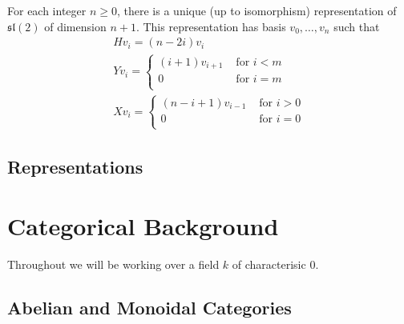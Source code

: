 \documentclass[]{article}
\newcommand{\sll}{\mathfrak{sl}}
\numberwithin{equation}{subsection}
\begin{document}
For each integer $n \geq 0$, there is a unique (up to isomorphism) representation of $\sll(2)$ of dimension $n+1$. This representation has basis $v_0, \ldots, v_{n}$ such that
\begin{align*}
    &H v_i = (n - 2i) v_i& \\
    &Y v_i = \begin{cases} 
                (i+1)v_{i+1}& \text{ for $i < m$} \\
                0& \text{ for $i = m$} \\
            \end{cases} \\
    &X v_i = \begin{cases} 
                (n-i+1)v_{i-1}& \text{ for $i > 0$} \\
                0& \text{ for $i = 0$} \\
            \end{cases}
\end{align*}


\subsection{Representations}

\section{Categorical Background}
Throughout we will be working over a field $k$ of characterisic 0.
\subsection{Abelian and Monoidal Categories}
\end{document}
